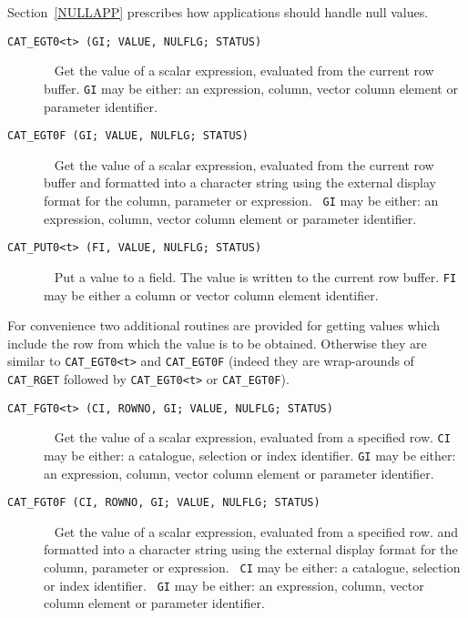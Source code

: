 Section~\ref{NULLAPP} prescribes how applications should handle null
values.

\begin{description}

  \item[ {\tt CAT\_EGT0<t> (GI; VALUE, NULFLG; STATUS) } ] ~
  \newline Get the value of a scalar expression, evaluated from the
   current row buffer. {\tt GI} may be either: an expression, column,
   vector column element or parameter identifier.

  \item[ {\tt CAT\_EGT0F (GI; VALUE, NULFLG; STATUS) } ] ~
  \newline Get the value of a scalar expression, evaluated from the
   current row buffer and formatted into a character string using the
   external display format for the column, parameter or expression. {\tt
   GI} may be either: an expression, column, vector column element or
   parameter identifier.

  \item[ {\tt CAT\_PUT0<t> (FI, VALUE, NULFLG; STATUS) } ] ~
  \newline Put a value to a field. The value is written to the current
   row buffer. {\tt FI} may be either a column or vector column element
   identifier.

\end{description}

For convenience two additional routines are provided for getting
values which include the row from which the value is to be obtained.
Otherwise they are similar to {\tt CAT\_EGT0<t>} and {\tt CAT\_EGT0F}
(indeed they are wrap-arounds of {\tt CAT\_RGET} followed by
{\tt CAT\_EGT0<t>} or {\tt CAT\_EGT0F}).

\begin{description}

  \item[ {\tt CAT\_FGT0<t> (CI, ROWNO, GI; VALUE, NULFLG; STATUS) } ] ~
  \newline Get the value of a scalar expression, evaluated from a
   specified row. {\tt CI} may be either: a catalogue, selection or
   index identifier. {\tt GI} may be either: an expression, column,
   vector column element or parameter identifier.

  \item[ {\tt CAT\_FGT0F (CI, ROWNO, GI; VALUE, NULFLG; STATUS) } ] ~
  \newline Get the value of a scalar expression, evaluated from a
   specified row. and formatted into a character string using the
   external display format for the column, parameter or expression. {\tt
   CI} may be either: a catalogue, selection or index identifier. {\tt
   GI} may be either: an expression, column, vector column element or
   parameter identifier.

\end{description}

